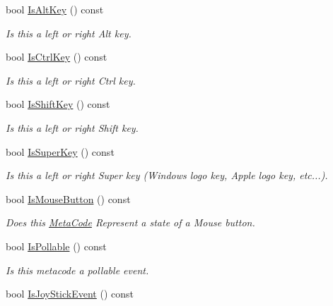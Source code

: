 \begin{DoxyCompactItemize}
bool \hyperlink{classphys_1_1MetaCode_a080323eaed78e0f9b9b3f2049ee036a1}{IsAltKey} () const 
\begin{DoxyCompactList}\small\item\em Is this a left or right Alt key. \item\end{DoxyCompactList}\item 
bool \hyperlink{classphys_1_1MetaCode_a25ce58069979e189e91ecbd77729ed22}{IsCtrlKey} () const 
\begin{DoxyCompactList}\small\item\em Is this a left or right Ctrl key. \item\end{DoxyCompactList}\item 
bool \hyperlink{classphys_1_1MetaCode_a2b2e4758229d1bba55ab47a2ca57863e}{IsShiftKey} () const 
\begin{DoxyCompactList}\small\item\em Is this a left or right Shift key. \item\end{DoxyCompactList}\item 
bool \hyperlink{classphys_1_1MetaCode_a8b63b7227b27c2be9de969c6b3a0963a}{IsSuperKey} () const 
\begin{DoxyCompactList}\small\item\em Is this a left or right Super key (Windows logo key, Apple logo key, etc...). \item\end{DoxyCompactList}\item 
bool \hyperlink{classphys_1_1MetaCode_a95fd9fa05a35711c5970490cee7889d1}{IsMouseButton} () const 
\begin{DoxyCompactList}\small\item\em Does this \hyperlink{classphys_1_1MetaCode}{MetaCode} Represent a state of a Mouse button. \item\end{DoxyCompactList}\item 
bool \hyperlink{classphys_1_1MetaCode_ac8709e0a9791db4cbd0fe9f6089efd57}{IsPollable} () const 
\begin{DoxyCompactList}\small\item\em Is this metacode a pollable event. \item\end{DoxyCompactList}\item 
bool \hyperlink{classphys_1_1MetaCode_a00ad1171e9e081318e6efc25a371ee05}{IsJoyStickEvent} () const 

\end{DoxyCompactItemize}
